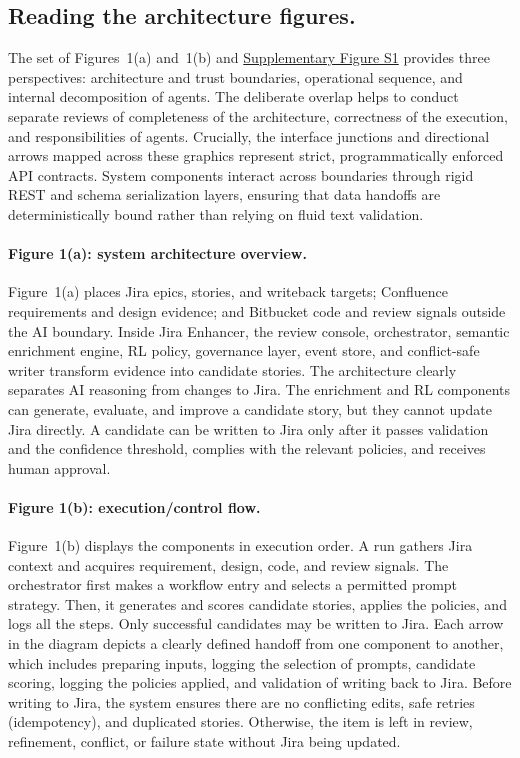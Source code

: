 \documentclass[10pt,a4paper]{article}
\begin{document}
\subsection{Reading the architecture figures.} The set of Figures~1(a) and~1(b) and \href{https://github.com/anonymous94u/JiraEnhancer/blob/main/supplementary/module_architecture.pdf}{Supplementary Figure S1} provides three perspectives: architecture and trust boundaries, operational sequence, and internal decomposition of agents. The deliberate overlap helps to conduct separate reviews of completeness of the architecture, correctness of the execution, and responsibilities of agents. Crucially, the interface junctions and directional arrows mapped across these graphics represent strict, programmatically enforced API contracts. System components interact across boundaries through rigid REST and schema serialization layers, ensuring that data handoffs are deterministically bound rather than relying on fluid text validation.

\paragraph{Figure 1(a): system architecture overview.}
Figure~1(a) places Jira epics, stories, and writeback targets; Confluence requirements and design evidence; and Bitbucket code and review signals outside the AI boundary. Inside Jira Enhancer, the review console, orchestrator, semantic enrichment engine, RL policy, governance layer, event store, and conflict-safe writer transform evidence into candidate stories. The architecture clearly separates AI reasoning from changes to Jira. The enrichment and RL components can generate, evaluate, and improve a candidate story, but they cannot update Jira directly. A candidate can be written to Jira only after it passes validation and the confidence threshold, complies with the relevant policies, and receives human approval.

\paragraph{Figure 1(b): execution/control flow.}
Figure~1(b) displays the components in execution order. A run gathers Jira context and acquires requirement, design, code, and review signals. The orchestrator first makes a workflow entry and selects a permitted prompt strategy. Then, it generates and scores candidate stories, applies the policies, and logs all the steps. Only successful candidates may be written to Jira. Each arrow in the diagram depicts a clearly defined handoff from one component to another, which includes preparing inputs, logging the selection of prompts, candidate scoring, logging the policies applied, and validation of writing back to Jira. Before writing to Jira, the system ensures there are no conflicting edits, safe retries (idempotency), and duplicated stories. Otherwise, the item is left in review, refinement, conflict, or failure state without Jira being updated.
\end{document}
